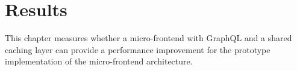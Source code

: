 \documentclass[MSE,Master,english]{twbook}%
\begin{document}

\fi

\chapter{Results}\label{chapter:results}

This chapter measures whether a micro-frontend with GraphQL and a shared caching layer can provide a performance improvement for the prototype implementation of the micro-frontend architecture. 
\end{document}
